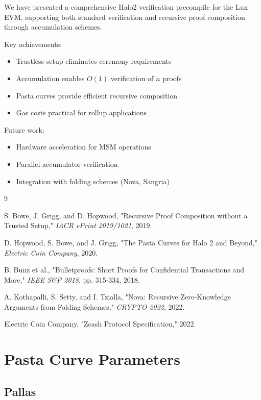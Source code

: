 \documentclass[11pt,a4paper]{article}
\theoremstyle{definition}
\begin{document}
We have presented a comprehensive Halo2 verification precompile for the Lux EVM, supporting both standard verification and recursive proof composition through accumulation schemes.

Key achievements:
\begin{itemize}
    \item Trustless setup eliminates ceremony requirements
    \item Accumulation enables $O(1)$ verification of $n$ proofs
    \item Pasta curves provide efficient recursive composition
    \item Gas costs practical for rollup applications
\end{itemize}

Future work:
\begin{itemize}
    \item Hardware acceleration for MSM operations
    \item Parallel accumulator verification
    \item Integration with folding schemes (Nova, Sangria)
\end{itemize}

\begin{thebibliography}{9}

S. Bowe, J. Grigg, and D. Hopwood, "Recursive Proof Composition without a Trusted Setup," \textit{IACR ePrint 2019/1021}, 2019.

D. Hopwood, S. Bowe, and J. Grigg, "The Pasta Curves for Halo 2 and Beyond," \textit{Electric Coin Company}, 2020.

B. Bunz et al., "Bulletproofs: Short Proofs for Confidential Transactions and More," \textit{IEEE S\&P 2018}, pp. 315-334, 2018.

A. Kothapalli, S. Setty, and I. Tzialla, "Nova: Recursive Zero-Knowledge Arguments from Folding Schemes," \textit{CRYPTO 2022}, 2022.

Electric Coin Company, "Zcash Protocol Specification," 2022.

\end{thebibliography}

\appendix

\section{Pasta Curve Parameters}

\subsection{Pallas}
\end{document}
